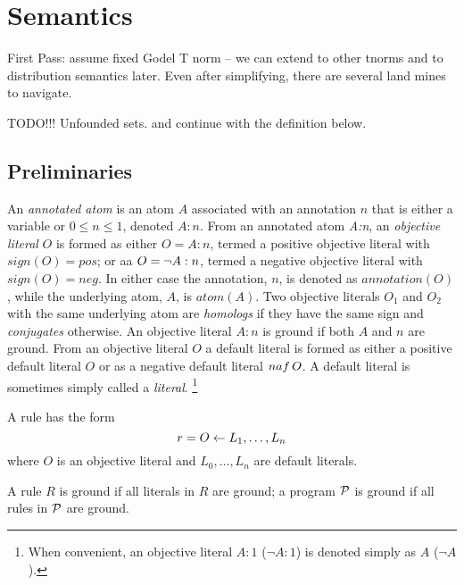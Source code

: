 \section{Semantics}\label{sec:semantics}
%
{\sc First Pass: assume fixed Godel T norm -- we can extend to other
  tnorms and to distribution semantics later.  Even after simplifying,
  there are several land mines to navigate.

TODO!!! 
Unfounded sets. and continue with the definition below.
}

\subsection{Preliminaries}

An {\em annotated atom} is an atom $A$ associated with an annotation
$n$ that is either a variable or $0 \leq n \leq 1$, denoted $A:n$.
From an annotated atom {\em A:n}, an {\em objective literal} $O$ is
formed as either $O = A:n$, termed a positive objective literal with
$sign(O) = pos$; or aa $O = \neg A:n$, termed a negative objective
literal with $sign(O) = neg$.  In either case the annotation, $n$, is
denoted as $ annotation(O)$, while the underlying atom, $A$, is
$atom(A)$.
%
Two objective literals $O_1$ and $O_2$ with the same underlying atom
are {\em homologs} if they have the same sign and {\em conjugates}
otherwise.  An objective literal $A:n$ is ground if both $A$ and $n$
are ground.
%
%
From an objective literal $O$ a default literal is formed as either a
positive default literal $O$ or as a negative default literal ${naf}\,
O$.  A default literal is sometimes simply called a {\em literal}.
\footnote{
When convenient, an objective literal $A:1$ ($\neg A:1$) is denoted
simply as $A$ ($\neg A$).}

A rule has the form
\[r = O \leftarrow{} L_1,\ldots,L_n\]
where $O$ is an objective literal and $L_0,\ldots,L_n$ are default
literals.

A rule $R$ is ground if all literals in $R$ are ground; a program
$\cP$ is ground if all rules in $\cP$ are ground.


